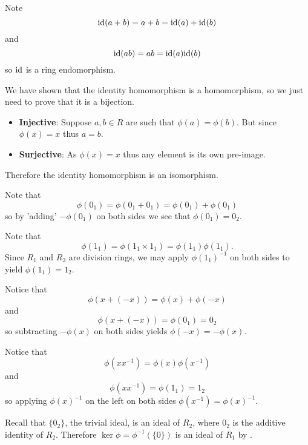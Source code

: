 \begin{questions}
    \item Note
    \[
        \mathrm{id}(a+b) = a + b = \mathrm{id}(a) + \mathrm{id}(b)
    \]
    and
    \[
        \mathrm{id}(ab) = ab = \mathrm{id}(a)\mathrm{id}(b)
    \]
    so $\mathrm{id}$ is a ring endomorphism.

    \item We have shown that the identity homomorphism is a homomorphism, so we just need to prove that it is a bijection.
    \begin{itemize}
        \item \textbf{Injective}: Suppose $a, b \in R$ are such that $\phi(a) = \phi(b)$. But since $\phi(x) = x$ thus $a = b$.
        \item \textbf{Surjective}: As $\phi(x) = x$ thus any element is its own pre-image.
    \end{itemize}
    Therefore the identity homomorphism is an isomorphism.

    \item Note that
    \[
        \phi(0_1) = \phi(0_1 + 0_1) = \phi(0_1) + \phi(0_1)
    \]
    so by 'adding' $-\phi(0_1)$ on both sides we see that $\phi(0_1) = 0_2$.

    \item Note that
    \[
        \phi(1_1) = \phi(1_1 \times 1_1) = \phi(1_1)\phi(1_1).
    \]
    Since $R_1$ and $R_2$ are division rings, we may apply $\phi(1_1)^{-1}$ on both sides to yield $\phi(1_1) = 1_2$.

    \item \begin{partquestions}{\alph*}
        \item Notice that
        \[
            \phi(x + (-x)) = \phi(x) + \phi(-x)
        \]
        and
        \[
            \phi(x + (-x)) = \phi(0_1) = 0_2
        \]
        so subtracting $-\phi(x)$ on both sides yields $\phi(-x) = -\phi(x)$.

        \item Notice that
        \[
            \phi(xx^{-1}) = \phi(x)\phi(x^{-1})
        \]
        and
        \[
            \phi(xx^{-1}) = \phi(1_1) = 1_2
        \]
        so applying $\phi(x)^{-1}$ on the left on both sides $\phi(x^{-1}) = \phi(x)^{-1}$.
    \end{partquestions}

    \item Recall that $\{0_2\}$, the trivial ideal, is an ideal of $R_2$, where $0_2$ is the additive identity of $R_2$. Therefore $\ker\phi = \phi^{-1}(\{0\})$ is an ideal of $R_1$ by .


\end{questions}
